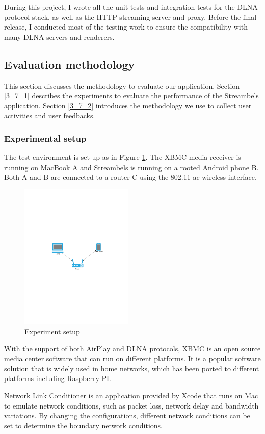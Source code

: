 During this project, I wrote all the unit tests and integration tests for the
DLNA protocol stack, as well as the HTTP streaming server and proxy. Before the
final release, I conducted most of the testing work to ensure the compatibility
with many DLNA servers and renderers.

\subsection{Evaluation methodology\label{3_7}}
This section discusses the methodology to evaluate our application. Section
\ref{3_7_1} describes the experiments to evaluate the performance of
the Streambels application. Section \ref{3_7_2} introduces the methodology we
use to collect user activities and user feedbacks.

\subsubsection{Experimental setup\label{3_7_1}}
The test environment is set up as in Figure \ref{setup}. The XBMC
media receiver is running on MacBook A and Streambels is running on a rooted
Android phone B. Both A and B are connected to a router C using the 802.11 ac
wireless interface.

\begin{figure}[htb]
\centering \includegraphics[height=7cm]{charts/experiment_setup}
\caption{Experiment setup \label{setup}}
\end{figure}

With the support of both AirPlay and DLNA protocols, XBMC is an open source
media center software that can run on different platforms. It is a popular
software solution that is widely used in home networks, which has been ported
to different platforms including Raspberry PI.

Network Link Conditioner is an application provided by Xcode that runs on Mac
to emulate network conditions, such as packet loss, network delay and bandwidth
variations. By changing the configurations, different network conditions can be
set to determine the boundary network conditions.

